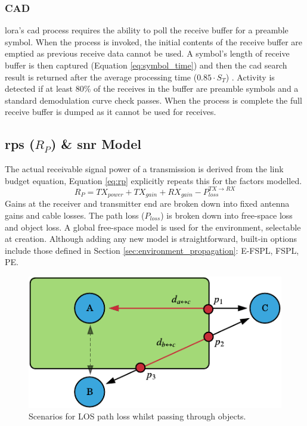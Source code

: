 \subsubsection{CAD}
\ac{lora}'s \ac{cad} process requires the ability to poll the receive buffer for a preamble symbol. When the process is invoked, the initial contents of the receive buffer are emptied as previous receive data cannot be used. A symbol's length of receive buffer is then captured (Equation \ref{eq:symbol_time}) and then the \ac{cad} search result is returned after the average processing time ($0.85\cdot S_T$) \cite{3YP:LORA_SX12}. Activity is detected if at least 80\% of the receives in the buffer are preamble symbols and a standard demodulation curve check passes. When the process is complete the full receive buffer is dumped as it cannot be used for receives.

\subsection{\ac{rps} ($R_P$) \& \ac{snr} Model}
The actual receivable signal power of a transmission is derived from the link budget equation, Equation \ref{eq:rp} explicitly repeats this for the factors modelled.
\begin{equation}
\label{eq:rp}
	R_P = TX_{power} + TX_{gain} + RX_{gain} - P_{loss}^{TX\rightarrow RX}
\end{equation}
Gains at the receiver and transmitter end are broken down into fixed antenna gains and cable losses. The path loss ($P_{loss}$) is broken down into free-space loss and object loss. A global free-space model is used for the environment, selectable at creation. Although adding any new model is straightforward,  built-in options include those defined in Section \ref{sec:environment_propagation}: E-FSPL, FSPL, PE. 

\begin{figure}[H]
    \centering
   	\includegraphics{Figures/obstacle_diagram}
    \caption[Object path loss scenarios]{
    	Scenarios for LOS path loss whilst passing through objects.   
    }
    \label{fig:object_path_loss}
\end{figure}

